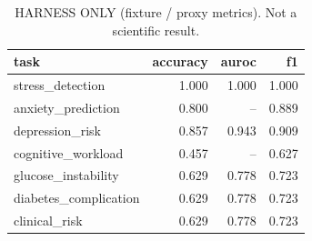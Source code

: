\begin{table}[t]
\centering
\caption{HARNESS ONLY (fixture / proxy metrics). Not a scientific result.}
\label{tab:clinical}
\begin{tabular}{lrrr}
\toprule
task & accuracy & auroc & f1 \\
\midrule
stress\_detection & 1.000 & 1.000 & 1.000 \\
anxiety\_prediction & 0.800 & -- & 0.889 \\
depression\_risk & 0.857 & 0.943 & 0.909 \\
cognitive\_workload & 0.457 & -- & 0.627 \\
glucose\_instability & 0.629 & 0.778 & 0.723 \\
diabetes\_complication & 0.629 & 0.778 & 0.723 \\
clinical\_risk & 0.629 & 0.778 & 0.723 \\
\bottomrule
\end{tabular}
\end{table}
